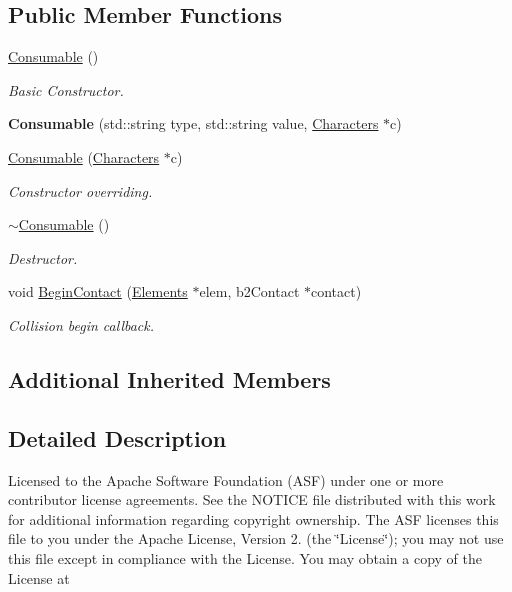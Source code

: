 \subsection*{Public Member Functions}
\begin{DoxyCompactItemize}
\item 
\hyperlink{class_consumable_ae374944f6333618dd08318b98b6950c7}{Consumable} ()
\begin{DoxyCompactList}\small\item\em Basic Constructor. \end{DoxyCompactList}\item 
\hypertarget{class_consumable_adf76e58745007421a38fb07af1c35d1a}{{\bfseries Consumable} (std\+::string type, std\+::string value, \hyperlink{class_characters}{Characters} $\ast$c)}\label{class_consumable_adf76e58745007421a38fb07af1c35d1a}

\item 
\hyperlink{class_consumable_adeca9f0d06a24fb2b76ddaa1396d1ddc}{Consumable} (\hyperlink{class_characters}{Characters} $\ast$c)
\begin{DoxyCompactList}\small\item\em Constructor overriding. \end{DoxyCompactList}\item 
\hypertarget{class_consumable_aed7671d58f80f5244e5851f591e4b8a2}{\hyperlink{class_consumable_aed7671d58f80f5244e5851f591e4b8a2}{$\sim$\+Consumable} ()}\label{class_consumable_aed7671d58f80f5244e5851f591e4b8a2}

\begin{DoxyCompactList}\small\item\em Destructor. \end{DoxyCompactList}\item 
void \hyperlink{class_consumable_adb866e69c3796edffad832b88e527518}{Begin\+Contact} (\hyperlink{class_elements}{Elements} $\ast$elem, b2\+Contact $\ast$contact)
\begin{DoxyCompactList}\small\item\em Collision begin callback. \end{DoxyCompactList}\end{DoxyCompactItemize}
\subsection*{Additional Inherited Members}


\subsection{Detailed Description}
Licensed to the Apache Software Foundation (A\+S\+F) under one or more contributor license agreements. See the N\+O\+T\+I\+C\+E file distributed with this work for additional information regarding copyright ownership. The A\+S\+F licenses this file to you under the Apache License, Version 2. (the \char`\"{}\+License\char`\"{}); you may not use this file except in compliance with the License. You may obtain a copy of the License at

